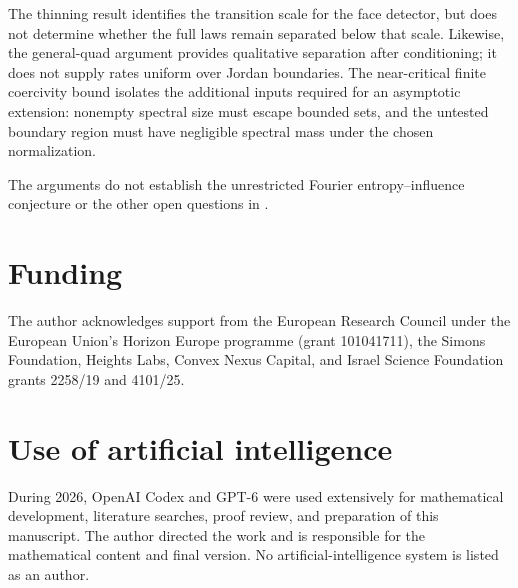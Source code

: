 The thinning result identifies the transition scale for the face detector, but does not determine whether the full laws remain separated below that scale. Likewise, the general-quad argument provides qualitative separation after conditioning; it does not supply rates uniform over Jordan boundaries. The near-critical finite coercivity bound isolates the additional inputs required for an asymptotic extension: nonempty spectral size must escape bounded sets, and the untested boundary region must have negligible spectral mass under the chosen normalization.

The arguments do not establish the unrestricted Fourier entropy--influence conjecture or the other open questions in \cite[Section~11]{GPS}.

\section*{Funding}
The author acknowledges support from the European Research Council under the European Union's Horizon Europe programme (grant 101041711), the Simons Foundation, Heights Labs, Convex Nexus Capital, and Israel Science Foundation grants 2258/19 and 4101/25.

\section*{Use of artificial intelligence}
During 2026, OpenAI Codex and GPT-6 were used extensively for mathematical development, literature searches, proof review, and preparation of this manuscript. The author directed the work and is responsible for the mathematical content and final version. No artificial-intelligence system is listed as an author.

